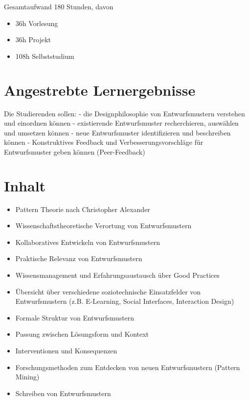 Gesamtaufwand 180 Stunden, davon

\begin{itemize}
\tightlist
\item
  36h Vorlesung
\item
  36h Projekt
\item
  108h Selbststudium
\end{itemize}

\section*{Angestrebte
Lernergebnisse\label{/mi-2017/modulbeschreibungen-master/MA_SC_Soziotechnische_Entwurfsmuster}}\label{angestrebte-lernergebnissepathlabelmi-2017modulbeschreibungen-mastermaux5fscux5fsoziotechnischeux5fentwurfsmuster}

Die Studierenden sollen: - die Designphilosophie von Entwurfsmustern
verstehen und einordnen können - existierende Entwurfsmuster
recherchieren, auswählen und umsetzen können - neue Entwurfsmuster
identifizieren und beschreiben können - Konstruktives Feedback und
Verbesserungsvorschläge für Entwurfsmuster geben können (Peer-Feedback)

\section*{Inhalt\label{/mi-2017/modulbeschreibungen-master/MA_SC_Soziotechnische_Entwurfsmuster}}\label{inhaltpathlabelmi-2017modulbeschreibungen-mastermaux5fscux5fsoziotechnischeux5fentwurfsmuster}

\begin{itemize}
\tightlist
\item
  Pattern Theorie nach Christopher Alexander
\item
  Wissenschaftstheoretische Verortung von Entwurfsmustern
\item
  Kollaboratives Entwickeln von Entwurfsmustern
\item
  Praktische Relevanz von Entwurfsmustern
\item
  Wissensmanagement und Erfahrungsaustausch über Good Practices
\item
  Übersicht über verschiedene soziotechnische Einsatzfelder von
  Entwurfsmustern (z.B. E-Learning, Social Interfaces, Interaction
  Design)
\item
  Formale Struktur von Entwurfsmustern
\item
  Passung zwischen Lösungsform und Kontext
\item
  Interventionen und Konsequenzen
\item
  Forschungsmethoden zum Entdecken von neuen Entwurfsmustern (Pattern
  Mining)
\item
  Schreiben von Entwurfsmustern
\end{itemize}

